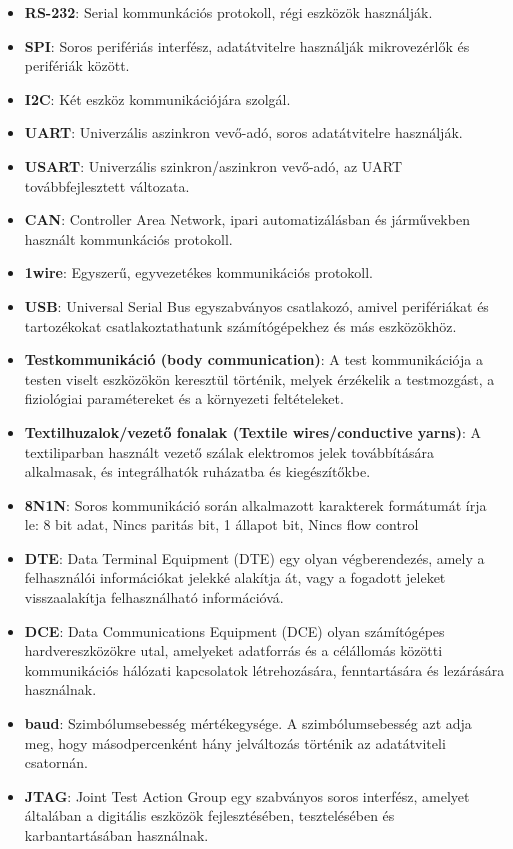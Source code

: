 \begin{itemize}
    \item \textbf{RS-232}: Serial kommunkációs protokoll, régi eszközök használják.
    \item \textbf{SPI}: Soros perifériás interfész, adatátvitelre használják mikrovezérlők és perifériák között.
    \item \textbf{I2C}: Két eszköz kommunikációjára szolgál.
    \item \textbf{UART}: Univerzális aszinkron vevő-adó, soros adatátvitelre használják.
    \item \textbf{USART}: Univerzális szinkron/aszinkron vevő-adó, az UART továbbfejlesztett változata.
    \item \textbf{CAN}: Controller Area Network, ipari automatizálásban és járművekben használt kommunkációs protokoll.
    \item \textbf{1wire}: Egyszerű, egyvezetékes kommunikációs protokoll.
    \item \textbf{USB}: Universal Serial Bus egyszabványos csatlakozó, amivel perifériákat és tartozékokat csatlakoztathatunk számítógépekhez és más eszközökhöz.
    \item \textbf{Testkommunikáció (body communication)}: A test kommunikációja a testen viselt eszközökön keresztül történik, melyek érzékelik a testmozgást, a fiziológiai paramétereket és a környezeti feltételeket.
    \item \textbf{Textilhuzalok/vezető fonalak (Textile wires/conductive yarns)}: A textiliparban használt vezető szálak elektromos jelek továbbítására alkalmasak, és integrálhatók ruházatba és kiegészítőkbe.
    \item \textbf{8N1N}: Soros kommunikáció során alkalmazott karakterek formátumát írja le: 8 bit adat, Nincs paritás bit, 1 állapot bit, Nincs flow control
    \item \textbf{DTE}: Data Terminal Equipment (DTE) egy olyan végberendezés, amely a felhasználói információkat jelekké alakítja át, vagy a fogadott jeleket visszaalakítja felhasználható információvá.
    \item \textbf{DCE}: Data Communications Equipment (DCE) olyan számítógépes hardvereszközökre utal, amelyeket adatforrás és a célállomás közötti kommunikációs hálózati kapcsolatok létrehozására, fenntartására és lezárására használnak.
    \item \textbf{baud}: Szimbólumsebesség mértékegysége. A szimbólumsebesség azt adja meg, hogy másodpercenként hány jelváltozás történik az adatátviteli csatornán.
    \item \textbf{JTAG}: Joint Test Action Group egy szabványos soros interfész, amelyet általában a digitális eszközök fejlesztésében, tesztelésében és karbantartásában használnak.

\end{itemize}
